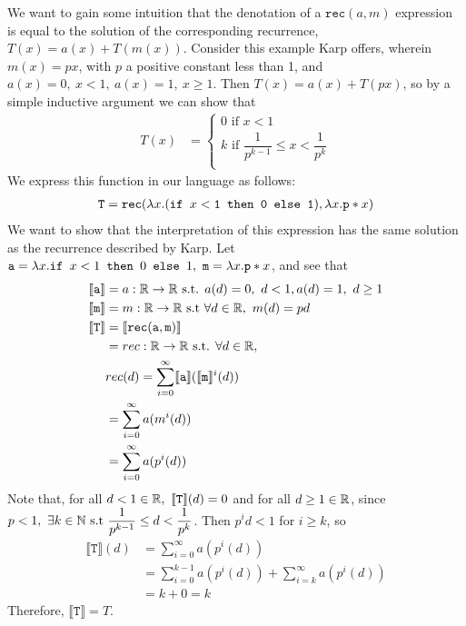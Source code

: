 We want to gain some intuition that the denotation of a $\texttt{rec}(a,m)$ expression is equal to the solution of the 
corresponding recurrence, $T(x) = a(x) + T(m(x))$.
Consider this example Karp offers, wherein $m(x) = px$, with $p$ a
positive constant less than 1, and $a(x) = 0, \ x < 1, \ a(x) = 1, \ x \geq 1$.
Then $T(x) = a(x) + T(px)$, so by a simple inductive argument we can show that 
\begin{align*}
T(x) &= 
 \begin{cases}
 0 \text{ if } x < 1 \\
 k \text{ if }  \dfrac{1}{p^{k-1}} \leq x < \dfrac{1}{p^k} \\
 \end{cases}
 \end{align*}
 We express this function in our language as follows: 
 \begin{align*}
 \texttt{T} = \texttt{rec}(\lambda x.(\texttt{if } x<\texttt{1} \texttt{ then } \texttt{0} \texttt{ else } \texttt{1}), \lambda x. \texttt{p}*x)
 \end{align*}
 We want to show that the interpretation of this expression has the same solution as the recurrence described by Karp.
 Let $\texttt{a} = \lambda x.\texttt{if } x<1 \texttt{ then } 0 \texttt{ else } 1, \ \texttt{m} = \lambda x.\texttt{p}*x$, and see that
 \begin{align*}
  \llbracket \texttt{a} \rrbracket &= a : \mathbb{R} \rightarrow \mathbb{R} \text{ s.t. } a(d) = 0, 
  \ d<1, a(d) = 1, \ d \geq 1  \\
 \llbracket \texttt{m} \rrbracket &= m : \mathbb{R} \rightarrow \mathbb{R} \text{ s.t } \forall d \in \mathbb{R}, \
 m(d) = pd \\
 \llbracket \texttt{T} \rrbracket&= \llbracket \texttt{rec}(\texttt{a}, \texttt{m}) \rrbracket \\
 &= rec: \mathbb{R} \rightarrow \mathbb{R} \text{ s.t. } \forall d \in \mathbb{R}, \\
 &rec(d) = \sum_{i=0}^{\infty}\llbracket \texttt{a} \rrbracket (\llbracket \texttt{m} \rrbracket^i(d)) \\
 &= \sum_{i=0}^{\infty}a (m^i(d)) \\
 &= \sum_{i=0}^{\infty}a (p^i(d))
 \end{align*}
Note that, for all $ d<1 \in \mathbb{R}, \ \llbracket \texttt{T} \rrbracket(d) = 0$
and for all $d \geq 1 \in \mathbb{R}$, since $p < 1, \ \exists k \in \mathbb{N} \text{ s.t } \dfrac{1}{p^{k-1}} \leq d < \dfrac{1}{p^k}$. Then
$p^id < 1$ for $i \geq k$, so
\begin{align*}
\llbracket \texttt{T} \rrbracket(d)&= \sum_{i=0}^{\infty}a (p^i(d)) \\
&= \sum_{i=0}^{k-1}a (p^i(d)) + \sum_{i=k}^{\infty}a (p^i(d)) \\
&= k + 0 = k
\end{align*}
Therefore, $\llbracket \texttt{T} \rrbracket = T$.
 

